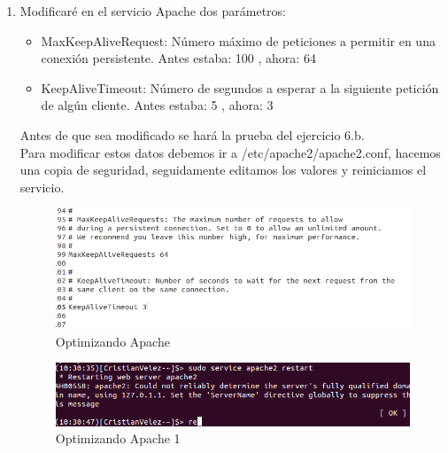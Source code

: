 \begin{enumerate}[label=(\alph*)]
	\item 
Modificaré en el servicio Apache dos parámetros:

\begin{itemize}
	\item MaxKeepAliveRequest: Número máximo de peticiones a permitir en una conexión persistente. Antes estaba: 100 , ahora: 64
	
	\item KeepAliveTimeout: Número de segundos a esperar a la siguiente petición de algún cliente. Antes estaba: 5 , ahora: 3
\end{itemize}

Antes de que sea modificado se hará la prueba del ejercicio 6.b.\\

Para modificar estos datos debemos ir a /etc/apache2/apache2.conf, hacemos una copia de seguridad, seguidamente editamos los valores y reiniciamos el servicio.

\begin{figure}[H] %
	\centering
	\includegraphics[scale=0.5]{pics/12}  %
	\caption{Optimizando Apache} \label{fig:5}
\end{figure}

\begin{figure}[H] %
	\centering
	\includegraphics[scale=0.5]{pics/13}  %
	\caption{Optimizando Apache 1} \label{fig:6}
\end{figure}


\end{enumerate}
